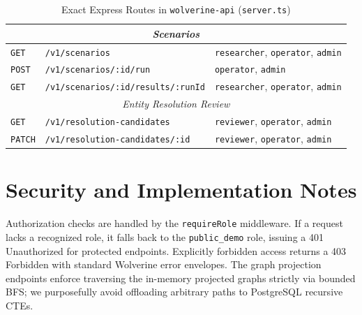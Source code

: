 \begin{table}[h!]
\begin{tabular}{llp{6cm}}
    \midrule
    \multicolumn{3}{c}{\textit{Scenarios}} \\
    \midrule
    \texttt{GET} & \texttt{/v1/scenarios} & \texttt{researcher}, \texttt{operator}, \texttt{admin} \\
    \texttt{POST} & \texttt{/v1/scenarios/:id/run} & \texttt{operator}, \texttt{admin} \\
    \texttt{GET} & \texttt{/v1/scenarios/:id/results/:runId} & \texttt{researcher}, \texttt{operator}, \texttt{admin} \\
    \midrule
    \multicolumn{3}{c}{\textit{Entity Resolution Review}} \\
    \midrule
    \texttt{GET} & \texttt{/v1/resolution-candidates} & \texttt{reviewer}, \texttt{operator}, \texttt{admin} \\
    \texttt{PATCH} & \texttt{/v1/resolution-candidates/:id} & \texttt{reviewer}, \texttt{operator}, \texttt{admin} \\
    \bottomrule
    \end{tabular}
    \vspace{0.5cm}
    \caption{Exact Express Routes in \texttt{wolverine-api} (\texttt{server.ts})}
    \label{tab:express_routes}
\end{table}

\section{Security and Implementation Notes}
Authorization checks are handled by the \texttt{requireRole} middleware. If a request lacks a recognized role, it falls back to the \texttt{public\_demo} role, issuing a 401 Unauthorized for protected endpoints. Explicitly forbidden access returns a 403 Forbidden with standard Wolverine error envelopes. The graph projection endpoints enforce traversing the in-memory projected graphs strictly via bounded BFS; we purposefully avoid offloading arbitrary paths to PostgreSQL recursive CTEs.
